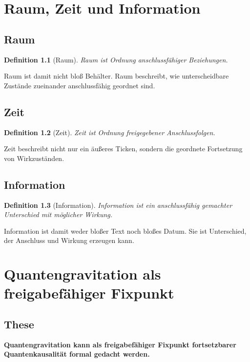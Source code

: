\documentclass[11pt,a4paper,oneside]{book}
\newtheorem{definition}{Definition}[chapter]
\begin{document}
\chapter{Raum, Zeit und Information}

\section{Raum}

\begin{definition}[Raum]
Raum ist Ordnung anschlussfähiger Beziehungen.
\end{definition}

Raum ist damit nicht bloß Behälter. Raum beschreibt, wie unterscheidbare Zustände zueinander anschlussfähig geordnet sind.

\section{Zeit}

\begin{definition}[Zeit]
Zeit ist Ordnung freigegebener Anschlussfolgen.
\end{definition}

Zeit beschreibt nicht nur ein äußeres Ticken, sondern die geordnete Fortsetzung von Wirkzuständen.

\section{Information}

\begin{definition}[Information]
Information ist ein anschlussfähig gemachter Unterschied mit möglicher Wirkung.
\end{definition}

Information ist damit weder bloßer Text noch bloßes Datum. Sie ist Unterschied, der Anschluss und Wirkung erzeugen kann.

\chapter{Quantengravitation als freigabefähiger Fixpunkt}

\section{These}

\begin{merkbox}
\centering
\textbf{Quantengravitation kann als freigabefähiger Fixpunkt fortsetzbarer Quantenkausalität formal gedacht werden.}
\end{merkbox}
\end{document}
